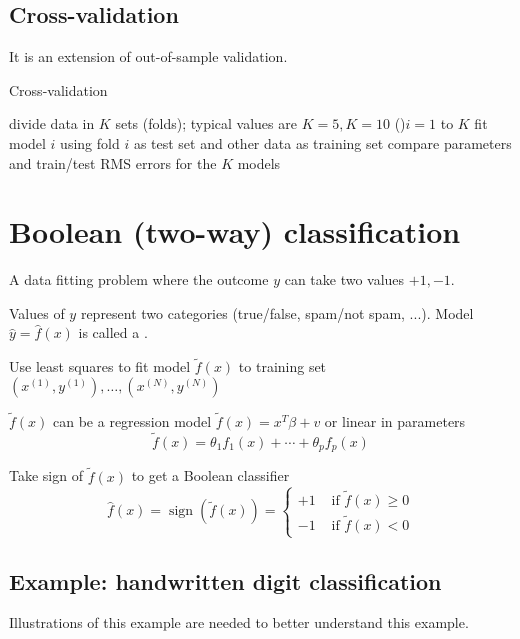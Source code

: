 \subsection{Cross-validation}

It is an extension of out-of-sample validation.

\begin{algorithm}[htbp]
    \caption{Cross-validation}
    divide data in $ K $ sets (folds); typical values are $ K=5, K=10 $\;
    \For(){$ i=1 $ to $ K $}{
        fit model $ i $ using fold $ i $ as test set and other data as training set\;
        compare parameters and train/test RMS errors for the $ K $ models
    }
\end{algorithm}


\section{Boolean (two-way) classification}

\begin{problem}
    A data fitting problem where the outcome $ y $ can take two values $ +1,-1 $.

    Values of $ y $ represent two categories (true/false, spam/not spam, ...). Model $ \hat{y}=\hat{f}(x) $ is called a .

\end{problem}

Use least squares to fit model $ \tilde{f}(x) $ to training set $ \left(x^{(1)}, y^{(1)}\right), \ldots,\left(x^{(N)}, y^{(N)}\right) $

$ \tilde{f}(x) $ can be a regression model $ \tilde{f}(x)=x^{T} \beta+v $ or linear in parameters
$$
\tilde{f}(x)=\theta_{1} f_{1}(x)+\cdots+\theta_{p} f_{p}(x)
$$

Take sign of $ \tilde{f}(x) $ to get a Boolean classifier
$$
\hat{f}(x)=\operatorname{sign}(\tilde{f}(x))=\left\{\begin{array}{ll}
+1 & \text { if } \tilde{f}(x) \geq 0 \\
-1 & \text { if } \tilde{f}(x)<0
\end{array}\right.
$$

\subsection{Example: handwritten digit classification}

\begin{remark}
    Illustrations of this example are needed to better understand this example.
\end{remark}

